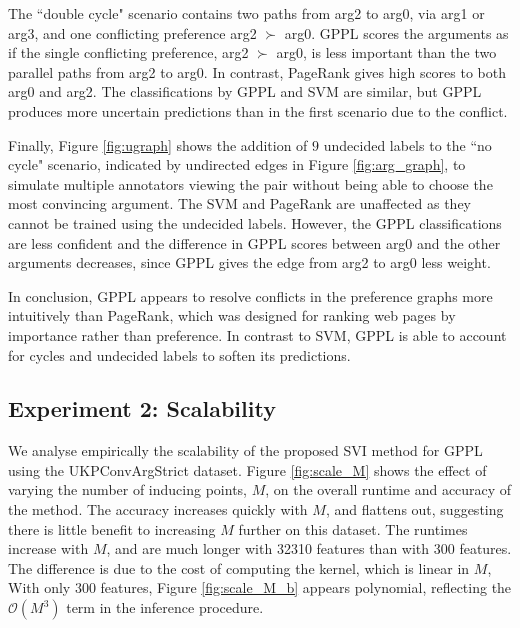 The ``double cycle" scenario contains two paths from arg2 to arg0, via arg1 or arg3, and one conflicting
preference arg2 $\succ$ arg0. 
GPPL scores the arguments as if the single conflicting preference, arg2 $\succ$ arg0, 
is less important than the two parallel paths from arg2 to arg0. 
In contrast, PageRank gives high scores to both arg0 and arg2.
The classifications by GPPL and SVM are similar, but GPPL produces more uncertain 
predictions than in the first scenario due to the conflict.

Finally,  Figure \ref{fig:ugraph} shows the addition of $9$ undecided labels to the ``no cycle" scenario, indicated by 
undirected edges in Figure \ref{fig:arg_graph}, to simulate multiple annotators viewing the pair without being able to choose the most convincing argument.
The SVM and PageRank are unaffected as they cannot be trained using the undecided labels.
However, the GPPL classifications are less confident and the difference in GPPL scores between arg0 and the other arguments decreases, since GPPL gives the edge from arg2 to arg0 less weight.

In conclusion, GPPL appears to resolve conflicts in the preference graphs
more intuitively than PageRank, which was designed for ranking web pages by 
importance rather than preference. 
In contrast to SVM, GPPL is able to account for cycles and undecided labels to soften its predictions.

\subsection{Experiment 2: Scalability}

We analyse empirically the scalability of the proposed SVI method for GPPL using the UKPConvArgStrict dataset.
Figure \ref{fig:scale_M} shows the effect of varying the number of inducing points, $M$, on the overall runtime and accuracy of the method. The accuracy increases quickly with $M$, and flattens out, suggesting there is little benefit to increasing  $M$ further on this dataset. 
The runtimes increase with $M$,  and are much longer with 32310 features than with 300 features.
The difference is due to the cost of computing the kernel, which is linear in $M$,
With only $300$ features, Figure \ref{fig:scale_M_b} appears polynomial, reflecting the 
$\mathcal{O}(M^3)$ term in the inference procedure. 

